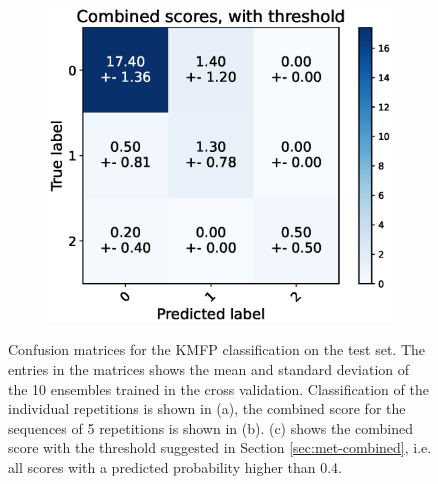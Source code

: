\begin{figure}
  \begin{subfigure}[t]{0.48\textwidth}
      \includegraphics[width=\textwidth]{files/figs/res/kmfp/cnf-combined-th.eps}
      \caption{}
      \label{fig:kmfp-cnf-comb-th}
  \end{subfigure}
  \caption{Confusion matrices for the KMFP classification on the test set. The entries in the matrices shows the mean and standard deviation of the 10 ensembles trained in the cross validation. Classification of the individual repetitions is shown in (a), the combined score for the sequences of 5 repetitions is shown in (b). (c) shows the combined score with the threshold suggested in Section \ref{sec:met-combined}, i.e. all scores with a predicted probability higher than 0.4.}
  \label{fig:kmfp-cnfs}
\end{figure}


